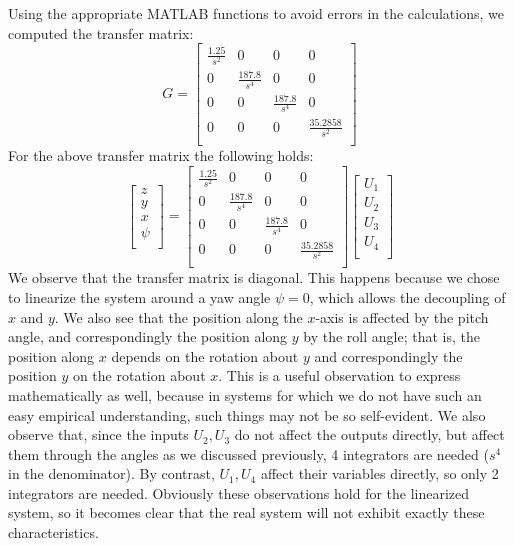 \documentclass[a4paper,12pt]{article}
\begin{document}
\noindent
Using the appropriate MATLAB functions to avoid errors in the calculations, we computed the transfer matrix:
\begin{equation*}
G =
\begin{bmatrix}
\frac{1.25}{s^2} & 0 & 0 & 0\\
0 & \frac{187.8}{s^4} & 0 & 0\\
0 & 0 & \frac{187.8}{s^4} & 0\\
0 & 0 & 0 & \frac{35.2858}{s^2}\\
\end{bmatrix}
\end{equation*}
\noindent
For the above transfer matrix the following holds:
\begin{equation*}
\begin{bmatrix}
    z\\
    y\\
    x\\
    \psi\\
\end{bmatrix} =
\begin{bmatrix}
\frac{1.25}{s^2} & 0 & 0 & 0\\
0 & \frac{187.8}{s^4} & 0 & 0\\
0 & 0 & \frac{187.8}{s^4} & 0\\
0 & 0 & 0 & \frac{35.2858}{s^2}\\
\end{bmatrix}
\begin{bmatrix}
    U_1\\
    U_2\\
    U_3\\
    U_4\\
\end{bmatrix}
\end{equation*}
We observe that the transfer matrix is diagonal. This happens because we chose to linearize the system around a yaw angle $\psi = 0$, which allows the decoupling of $x$ and $y$. We also see that the position along the $x$-axis is affected by the pitch angle, and correspondingly the position along $y$ by the roll angle; that is, the position along $x$ depends on the rotation about $y$ and correspondingly the position $y$ on the rotation about $x$. This is a useful observation to express mathematically as well, because in systems for which we do not have such an easy empirical understanding, such things may not be so self-evident. We also observe that, since the inputs $U_2, U_3$ do not affect the outputs directly, but affect them through the angles as we discussed previously, 4 integrators are needed ($s^4$ in the denominator). By contrast, $U_1, U_4$ affect their variables directly, so only 2 integrators are needed.
\newline
\newline
Obviously these observations hold for the linearized system, so it becomes clear that the real system will not exhibit exactly these characteristics.
\newpage
\end{document}
